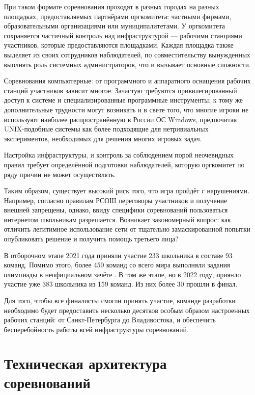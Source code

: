 При таком формате соревнования проходят в разных городах на разных площадках, предоставляемых партнёрами оргкомитета: частными фирмами, образовательными организациями или муниципалитетами. У оргкомитета сохраняется частичный контроль над инфраструктурой --- рабочими станциями участников, которые предоставляются площадками. Каждая площадка также выделяет из своих сотрудников наблюдателей, по совместительству вынужденных выолнять роль системных администраторов, что и вызывает основные сложности.

Соревнования компьютерные: от программного и аппаратного оснащения рабочих станций участников зависит многое. Зачастую требуются привилегированный доступ к системе и специализированные программные инструменты; к тому же дополнительные трудности могут возникать и в свете того, что многие игроки не используют наиболее распространённую в России ОС Windows, предпочитая UNIX-подобные системы как более подходящие для нетривиальных экспериментов, необходимых для решения многих игровых задач.

Настройка инфраструктуры, и контроль за соблюдением порой неочевидных правил требует определённой подготовки наблюдателей, которую оргкомитет по ряду причин не может осуществлять.

Таким образом, существует высокий риск того, что игра пройдёт с нарушениями. Например, согласно правилам РСОШ переговоры участников и получение внешней запрещены, однако, ввиду специфики соревнований пользоваться интернетом школьникам разрешается. Возникает закономерный вопрос: как отличить легитимное использование сети от тщательно замаскированной попытки опубликовать решение и получить помощь третьего лица?

В отборочном этапе 2021 года приняли участие 233 школьника в составе 93 команд. Помимо этого, более 450 команд со всего мира выполняли задания олимпиады в неофициальном зачёте \cite{Ugra21}. В том же этапе, но в 2022 году, приянло участие уже 383 школьника из 159 команд. Из них более 30 прошли в финал.

Для того, чтобы все финалисты смогли принять участие, команде разработки необходимо будет предоставить несколько десятков особым образом настроенных рабочих станций: от Санкт-Петербурга до Владивостока, и обеспечить бесперебойность работы всей инфраструктуры соревнований.



\section{Техническая архитектура соревнований}

